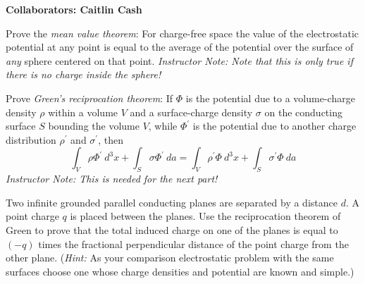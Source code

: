 \documentclass[11pt]{cubouldpset}
\newcommand{\collaborators}[1]{\textbf{Collaborators: #1}}
\begin{document}
\collaborators{Caitlin Cash}

\begin{problem}[1.10 (5 points)] 

Prove the \textit{mean value theorem}: For charge-free space the value of the electrostatic potential at any point is equal to the average of the potential over the surface of \textit{any} sphere centered on that point.
\newline
\newline
\textit{Instructor Note: Note that this is only true if there is no charge inside the sphere!}

\end{problem}

\begin{solution}
\vfill
\end{solution}

\newpage

\begin{problem}[1.12 (5 points)] 

Prove \textit{Green's reciprocation theorem}: If $\Phi$ is the potential due to a volume-charge density $\rho$ within a volume $V$ and a surface-charge density $\sigma$ on the conducting surface $S$ bounding the volume $V$, while $\Phi^\prime$ is the potential due to another charge distribution $\rho^\prime$ and $\sigma^\prime$, then
$$\int_V \rho\Phi^\prime\ d^3x + \int_S \sigma \Phi^\prime\ da = \int_V \rho^\prime \Phi\ d^3x + \int_S \sigma^\prime \Phi\ da$$
\newline
\textit{Instructor Note: This is needed for the next part!}

\end{problem}

\begin{solution}
\vfill
\end{solution}

\newpage

\begin{problem}[1.13 (10 points)] 

Two infinite grounded parallel conducting planes are separated by a distance $d$. A point charge $q$ is placed between the planes. Use the reciprocation theorem of Green to prove that the total induced charge on one of the planes is equal to $(-q)$ times the fractional perpendicular distance of the point charge from the other plane.
\newline
(\textit{Hint:} As your comparison electrostatic problem with the same surfaces choose one whose charge densities and potential are known and simple.)

\end{problem}
\end{document}
